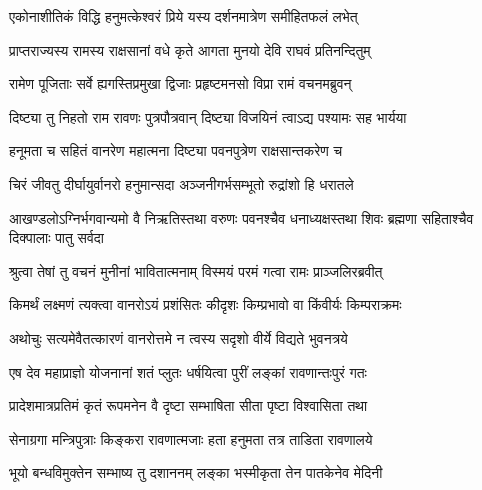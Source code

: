 
\vakta{}
\shrota{}
\tags{}
\notes{}

\storymeta





\twolineshloka
{एकोनाशीतिकं विद्धि हनुमत्केश्वरं प्रिये}
{यस्य दर्शनमात्रेण समीहितफलं लभेत्}%

\twolineshloka
{प्राप्तराज्यस्य रामस्य राक्षसानां वधे कृते}
{आगता मुनयो देवि राघवं प्रतिनन्दितुम्}%

\twolineshloka
{रामेण पूजिताः सर्वे ह्यगस्तिप्रमुखा द्विजाः}
{प्रहृष्टमनसो विप्रा रामं वचनमब्रुवन्}%

\twolineshloka
{दिष्ट्या तु निहतो राम रावणः पुत्रपौत्रवान्}
{दिष्ट्या विजयिनं त्वाऽद्य पश्यामः सह भार्यया}%

\twolineshloka
{हनूमता च सहितं वानरेण महात्मना}
{दिष्ट्या पवनपुत्रेण राक्षसान्तकरेण च}%

\twolineshloka
{चिरं जीवतु दीर्घायुर्वानरो हनुमान्सदा}
{अञ्जनीगर्भसम्भूतो रुद्रांशो हि धरातले}%

\threelineshloka
{आखण्डलोऽग्निर्भगवान्यमो वै निऋतिस्तथा}
{वरुणः पवनश्चैव धनाध्यक्षस्तथा शिवः}
{ब्रह्मणा सहिताश्चैव दिक्पालाः पातु सर्वदा}%

\twolineshloka
{श्रुत्वा तेषां तु वचनं मुनीनां भावितात्मनाम्}
{विस्मयं परमं गत्वा रामः प्राञ्जलिरब्रवीत्}%

\twolineshloka
{किमर्थं लक्ष्मणं त्यक्त्वा वानरोऽयं प्रशंसितः}
{कीदृशः किम्प्रभावो वा किंवीर्यः किम्पराक्रमः}%

\twolineshloka
{अथोचुः सत्यमेवैतत्कारणं वानरोत्तमे}
{न त्वस्य सदृशो वीर्ये विद्यते भुवनत्रये}%

\twolineshloka
{एष देव महाप्राज्ञो योजनानां शतं प्लुतः}
{धर्षयित्वा पुरीं लङ्कां रावणान्तःपुरं गतः}%

\twolineshloka
{प्रादेशमात्रप्रतिमं कृतं रूपमनेन वै}
{दृष्टा सम्भाषिता सीता पृष्टा विश्वासिता तथा}%

\twolineshloka
{सेनाग्रगा मन्त्रिपुत्राः किङ्करा रावणात्मजाः}
{हता हनुमता तत्र ताडिता रावणालये}%

\twolineshloka
{भूयो बन्धविमुक्तेन सम्भाष्य तु दशाननम्}
{लङ्का भस्मीकृता तेन पातकेनेव मेदिनी}%

